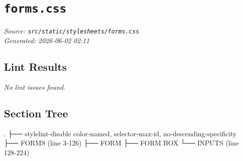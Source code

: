 
\section{\texttt{forms.css}}
\textit{Source: \texttt{src/static/stylesheets/forms.css}} \\
\textit{Generated: 2026-06-02 02:11} \\

\subsection{Lint Results}
\textit{No lint issues found.} \\

\subsection{Section Tree}
\begingroup
\linespread{0.9}\selectfont
\begin{verbnobox}[\FiraCode]
.
├── stylelint-disable color-named, selector-max-id, no-descending-specificity
├── FORMS  (line 3-126)
├── FORM
├── FORM BOX
└── INPUTS  (line 128-224)
\end{verbnobox}
\endgroup
